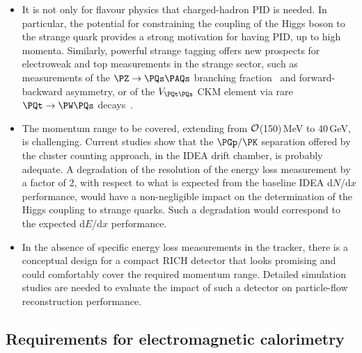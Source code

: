 \begin{itemize}

\item It is not only for flavour physics that charged-hadron PID is needed. 
In particular, the potential for constraining the coupling of the Higgs boson to the strange quark provides a strong motivation for having PID, up to high momenta. 
Similarly, powerful strange tagging offers new prospects for electroweak and top measurements in the strange sector, 
such as measurements of the $\PZ \to \PQs \PAQs$ branching fraction~\cite{Blekman:2024wyf} and forward-backward asymmetry,
or of the $V_{\PQt\PQs}$ CKM element via rare $\PQt \to \PW \PQs$ decays~\cite{giappichini_2024_te64m-zbm05}. 

\item The momentum range to be covered, extending from ${\cal{O}}$(150)\,MeV to 40\,GeV, is challenging. 
Current studies show that the $\PGp/\PK$ separation offered by the cluster counting approach, in the IDEA drift chamber, is probably adequate. 
A degradation of the resolution of the energy loss measurement by a factor of 2, with respect to what is expected from the baseline IDEA d$N$/d$x$ performance, 
would have a non-negligible impact on the determination of the Higgs coupling to strange quarks. 
Such a degradation would correspond to the expected d$E$/d$x$ performance.

\item In the absence of specific energy loss measurements in the tracker, 
there is a conceptual design for a compact RICH detector that looks promising and could comfortably cover the required momentum range. 
Detailed simulation studies are needed to evaluate the impact of such a detector on particle-flow reconstruction performance.

\end{itemize}

\subsection{Requirements for electromagnetic calorimetry}
\label{sec:PhysPerf_ECAL}

